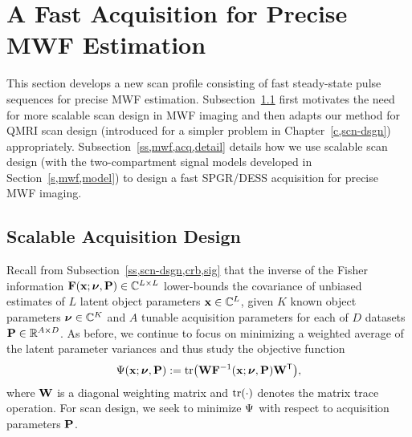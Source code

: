 \section{A Fast Acquisition for Precise MWF Estimation}
\label{s,mwf,acq}

This section develops a new scan profile
consisting of fast steady-state pulse sequences
for precise MWF estimation.
Subsection~\ref{ss,mwf,acq,design} 
first motivates the need
for more scalable scan design
in MWF imaging 
and then adapts our method 
for QMRI scan design
(introduced for a simpler problem 
in Chapter~\ref{c,scn-dsgn}) appropriately.
Subsection~\ref{ss,mwf,acq,detail}
details how we use scalable scan design
(with the two-compartment signal models developed 
in Section~\ref{s,mwf,model})
to design a fast SPGR/DESS acquisition 
for precise MWF imaging.

\subsection{Scalable Acquisition Design}
\label{ss,mwf,acq,design}

Recall from Subsection~\ref{ss,scn-dsgn,crb,sig} 
that the inverse 
of the Fisher information 
$\Fisher{\bmx;\bmnu,\bmP} \in \complexes{L \times L}$ 
lower-bounds the covariance
of unbiased estimates 
of $L$ latent object parameters $\mathbf{x} \in \mathbb{C}^{L}$,
given $K$ known object parameters $\boldsymbol{\nu} \in \mathbb{C}^{K}$ 
and $A$ tunable acquisition parameters 
for each of $D$ datasets 
$\mathbf{P} \in \mathbb{R}^{A \times D}$.
As before, we continue to focus 
on minimizing a weighted average 
of the latent parameter variances
and thus study the objective function
\begin{align}
	\costa{\bmx; \bmnu, \bmP} := 
		\trace{\bmW \bmF^{-1}\paren{\bmx;\bmnu,\bmP} \bmW\tpose},
	\label{eq:mwf,cost}
\end{align}
where $\mathbf{W}$ is a diagonal weighting matrix
and $\trace{\cdot}$ denotes the matrix trace operation.
For scan design,
we seek to minimize $\Psi$
with respect to acquisition parameters $\mathbf{P}$.

